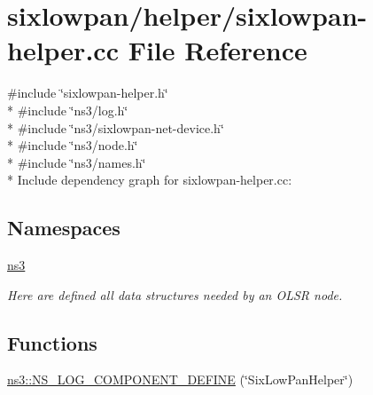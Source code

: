 \hypertarget{sixlowpan-helper_8cc}{}\section{sixlowpan/helper/sixlowpan-\/helper.cc File Reference}
\label{sixlowpan-helper_8cc}
{\ttfamily \#include \char`\"{}sixlowpan-\/helper.\+h\char`\"{}}\\*
{\ttfamily \#include \char`\"{}ns3/log.\+h\char`\"{}}\\*
{\ttfamily \#include \char`\"{}ns3/sixlowpan-\/net-\/device.\+h\char`\"{}}\\*
{\ttfamily \#include \char`\"{}ns3/node.\+h\char`\"{}}\\*
{\ttfamily \#include \char`\"{}ns3/names.\+h\char`\"{}}\\*
Include dependency graph for sixlowpan-\/helper.cc\+:
\subsection*{Namespaces}
\begin{DoxyCompactItemize}
\item 
 \hyperlink{namespacens3}{ns3}
\begin{DoxyCompactList}\small\item\em Here are defined all data structures needed by an O\+L\+SR node. \end{DoxyCompactList}\end{DoxyCompactItemize}
\subsection*{Functions}
\begin{DoxyCompactItemize}
\item 
\hyperlink{namespacens3_a9136d328df8c0b3fa6e48a46bb3fbc36}{ns3\+::\+N\+S\+\_\+\+L\+O\+G\+\_\+\+C\+O\+M\+P\+O\+N\+E\+N\+T\+\_\+\+D\+E\+F\+I\+NE} (\char`\"{}Six\+Low\+Pan\+Helper\char`\"{})
\end{DoxyCompactItemize}
